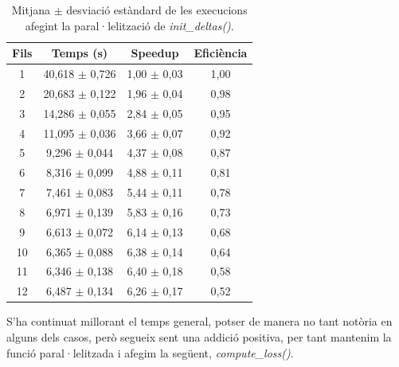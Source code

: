 \documentclass{article}
\begin{document}
\begin{table}[H]
\centering
\begin{tabular}{|c|c|c|c|}
\hline
\textbf{Fils} & \textbf{Temps (s)} & \textbf{Speedup} & \textbf{Eficiència} \\ \hline
1 & 40,618 $\pm$ 0,726 & 1,00 $\pm$ 0,03 & 1,00 \\ \hline
2 & 20,683 $\pm$ 0,122 & 1,96 $\pm$ 0,04 & 0,98 \\ \hline
3 & 14,286 $\pm$ 0,055 & 2,84 $\pm$ 0,05 & 0,95 \\ \hline
4 & 11,095 $\pm$ 0,036 & 3,66 $\pm$ 0,07 & 0,92 \\ \hline
5 & 9,296 $\pm$ 0,044 & 4,37 $\pm$ 0,08 & 0,87 \\ \hline
6 & 8,316 $\pm$ 0,099 & 4,88 $\pm$ 0,11 & 0,81 \\ \hline
7 & 7,461 $\pm$ 0,083 & 5,44 $\pm$ 0,11 & 0,78 \\ \hline
8 & 6,971 $\pm$ 0,139 & 5,83 $\pm$ 0,16 & 0,73 \\ \hline
9 & 6,613 $\pm$ 0,072 & 6,14 $\pm$ 0,13 & 0,68 \\ \hline
10 & 6,365 $\pm$ 0,088 & 6,38 $\pm$ 0,14 & 0,64 \\ \hline
11 & 6,346 $\pm$ 0,138 & 6,40 $\pm$ 0,18 & 0,58 \\ \hline
12 & 6,487 $\pm$ 0,134 & 6,26 $\pm$ 0,17 & 0,52 \\ \hline
\end{tabular}
\caption{Mitjana $\pm$ desviació estàndard de les execucions afegint la paral·lelització de \textit{init\_deltas()}.}
\label{tab:resultats6}
\end{table}

S'ha continuat millorant el temps general, potser de manera no tant notòria en alguns dels casos, però segueix sent una addició positiva, per tant mantenim la funció paral·lelitzada i afegim la següent, \textit{compute\_loss()}.
\end{document}
